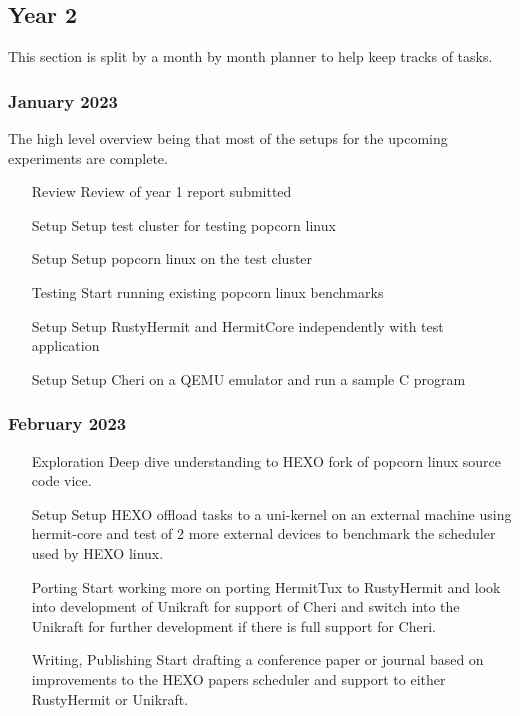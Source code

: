 \subsection{Year 2}
This section is split by a month by month planner to help keep tracks of tasks. 

\subsubsection{January 2023}
The high level overview being that most of the setups for the upcoming experiments
are complete. 
\begin{enumerate}
    \item [Review] Review of year 1 report submitted 
    \item [Setup] Setup test cluster for testing popcorn linux 
    \item [Setup] Setup popcorn linux on the test cluster
    \item [Testing] Start running existing popcorn linux benchmarks 
    \item [Setup] Setup RustyHermit and HermitCore independently with test application 
    \item [Setup] Setup Cheri on a QEMU emulator and run a sample C program 
  \end{enumerate} 


  \subsubsection{February 2023}
  \begin{enumerate}
    \item [Exploration] Deep dive understanding to HEXO fork of popcorn linux source code vice.
    \item [Setup] Setup HEXO offload tasks to a uni-kernel on an external machine using hermit-core 
    and test of 2 more external devices to benchmark the scheduler used by HEXO linux. 
    \item [Porting] Start working more on porting HermitTux to RustyHermit and look into 
    development of Unikraft for support of Cheri and switch into the Unikraft for further 
    development if there is full support for Cheri. 
    \item [Writing, Publishing] Start drafting a conference paper or journal based on improvements to the HEXO papers 
    scheduler and support to either RustyHermit or Unikraft. 
  \end{enumerate}

